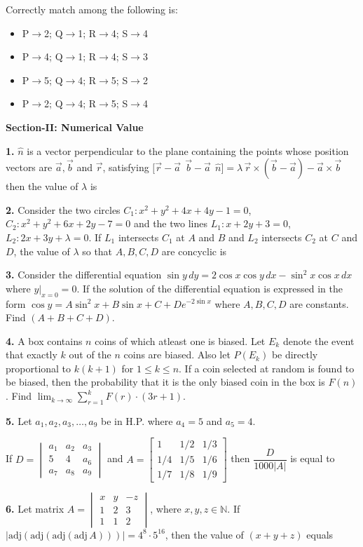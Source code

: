 \documentclass[10pt,twocolumn]{extarticle}
\newenvironment{qoptions}{\begin{itemize}[leftmargin=1.8em,itemsep=2pt,topsep=2pt,label={}]}{\end{itemize}}
\newcommand{\opt}[2]{\item[({#1})] {#2}}
\newcommand{\subsectionhdr}[1]{\par\vspace{3pt}\noindent\textbf{#1}\par\vspace{2pt}}
\begin{document}
Correctly match among the following is:
\begin{qoptions}
\opt{A}{P$\to$2; Q$\to$1; R$\to$4; S$\to$4}
\opt{B}{P$\to$4; Q$\to$1; R$\to$4; S$\to$3}
\opt{C}{P$\to$5; Q$\to$4; R$\to$5; S$\to$2}
\opt{D}{P$\to$2; Q$\to$4; R$\to$5; S$\to$4}
\end{qoptions}

\subsectionhdr{Section-II: Numerical Value}

\textbf{1.} $\hat n$ is a vector perpendicular to the plane containing the points whose position vectors are $\vec a,\vec b$ and $\vec r$, satisfying $\big[\vec r-\vec a\ \ \vec b-\vec a\ \ \hat n\big]=\lambda\,\vec r\times(\vec b-\vec a)-\vec a\times\vec b$ then the value of $\lambda$ is

\textbf{2.} Consider the two circles $C_1: x^2+y^2+4x+4y-1=0$, $C_2: x^2+y^2+6x+2y-7=0$ and the two lines $L_1: x+2y+3=0$, $L_2: 2x+3y+\lambda=0$. If $L_1$ intersects $C_1$ at $A$ and $B$ and $L_2$ intersects $C_2$ at $C$ and $D$, the value of $\lambda$ so that $A,B,C,D$ are concyclic is

\textbf{3.} Consider the differential equation $\sin y\,dy=2\cos x\cos y\,dx-\sin^2x\cos x\,dx$ where $y|_{x=0}=0$. If the solution of the differential equation is expressed in the form $\cos y=A\sin^2x+B\sin x+C+De^{-2\sin x}$ where $A,B,C,D$ are constants. Find $(A+B+C+D)$.

\textbf{4.} A box contains $n$ coins of which atleast one is biased. Let $E_k$ denote the event that exactly $k$ out of the $n$ coins are biased. Also let $P(E_k)$ be directly proportional to $k(k+1)$ for $1\le k\le n$. If a coin selected at random is found to be biased, then the probability that it is the only biased coin in the box is $F(n)$. Find $\displaystyle\lim_{k\to\infty}\sum_{r=1}^{k}F(r)\cdot(3r+1)$.

\textbf{5.} Let $a_1,a_2,a_3,\ldots,a_9$ be in H.P. where $a_4=5$ and $a_5=4$.

If $D=\begin{vmatrix}a_1 & a_2 & a_3\\ 5 & 4 & a_6\\ a_7 & a_8 & a_9\end{vmatrix}$ and $A=\begin{bmatrix}1 & 1/2 & 1/3\\ 1/4 & 1/5 & 1/6\\ 1/7 & 1/8 & 1/9\end{bmatrix}$ then $\dfrac{D}{1000|A|}$ is equal to

\textbf{6.} Let matrix $A=\begin{vmatrix}x & y & -z\\ 1 & 2 & 3\\ 1 & 1 & 2\end{vmatrix}$, where $x,y,z\in\mathbb{N}$. If $|\text{adj}(\text{adj}(\text{adj}(\text{adj}\,A)))|=4^8\cdot5^{16}$, then the value of $(x+y+z)$ equals
\end{document}
